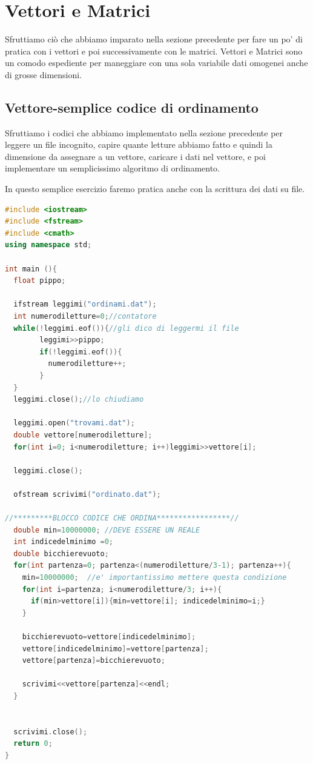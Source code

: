 \documentclass[11pt,fleqn]{book} %
\begin{document}
\section{Vettori e Matrici}

Sfruttiamo ciò che abbiamo imparato nella sezione precedente per fare un po' di pratica con i vettori e poi successivamente con le matrici.
Vettori e Matrici sono un comodo espediente per maneggiare con una sola variabile dati omogenei anche di grosse dimensioni.


\subsection{Vettore-semplice codice di ordinamento}

Sfruttiamo i codici che abbiamo implementato nella sezione precedente per leggere un file incognito, capire quante letture abbiamo fatto e quindi la dimensione da assegnare a un vettore, caricare i dati nel vettore, e poi implementare un semplicissimo algoritmo di ordinamento.

In questo semplice esercizio faremo pratica anche con la scrittura dei dati su file.

\begin{lstlisting}[language=c++]
#include <iostream>
#include <fstream>
#include <cmath>
using namespace std;

int main (){
  float pippo;

  ifstream leggimi("ordinami.dat");
  int numerodiletture=0;//contatore 
  while(!leggimi.eof()){//gli dico di leggermi il file
        leggimi>>pippo;
        if(!leggimi.eof()){
          numerodiletture++;
        }
  }
  leggimi.close();//lo chiudiamo

  leggimi.open("trovami.dat");
  double vettore[numerodiletture];
  for(int i=0; i<numerodiletture; i++)leggimi>>vettore[i];

  leggimi.close();

  ofstream scrivimi("ordinato.dat");
  
//*********BLOCCO CODICE CHE ORDINA*****************//  
  double min=10000000; //DEVE ESSERE UN REALE   
  int indicedelminimo =0;
  double bicchierevuoto;
  for(int partenza=0; partenza<(numerodiletture/3-1); partenza++){
    min=10000000;  //e' importantissimo mettere questa condizione
    for(int i=partenza; i<numerodiletture/3; i++){
      if(min>vettore[i]){min=vettore[i]; indicedelminimo=i;}
    }

    bicchierevuoto=vettore[indicedelminimo];
    vettore[indicedelminimo]=vettore[partenza];
    vettore[partenza]=bicchierevuoto;

    scrivimi<<vettore[partenza]<<endl;
  }
  
  
  scrivimi.close();
  return 0;
}
\end{lstlisting}
\end{document}
